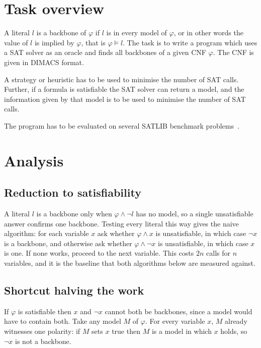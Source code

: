 \documentclass[11pt,a4paper]{article}
\begin{document}
\makereporttitle

\section{Task overview}

A literal $l$ is a backbone of $\varphi$ if $l$ is in every model of
$\varphi$, or in other words the value of $l$ is implied by $\varphi$, that is
$\varphi \models l$. The task is to write a program which uses a SAT solver as
an oracle and finds all backbones of a given CNF $\varphi$. The CNF is given
in DIMACS format.

A strategy or heuristic has to be used to minimise the number of SAT calls. Further, if a
formula is satisfiable the SAT solver can return a model, and the information
given by that model is to be used to minimise the number of SAT calls.

The program has to be evaluated on several SATLIB benchmark
problems~\cite{satlib}.

\section{Analysis}

\subsection*{Reduction to satisfiability}

A literal $l$ is a backbone only when $\varphi \wedge \neg l$ has no model,
so a single unsatisfiable answer confirms one backbone. Testing every literal
this way gives the naive algorithm: for each variable $x$ ask whether
$\varphi \wedge x$ is unsatisfiable, in which case $\neg x$ is a backbone, and
otherwise ask whether $\varphi \wedge \neg x$ is unsatisfiable, in which case
$x$ is one. If none works, proceed to the next variable. This costs $2n$ calls for $n$ variables, and it is the baseline
that both algorithms below are measured against.

\subsection*{Shortcut halving the work}

If $\varphi$ is satisfiable then $x$ and $\neg x$ cannot both be backbones,
since a model would have to contain both. Take any model $M$ of $\varphi$.
For every variable $x$, $M$ already witnesses one polarity: if $M$ sets $x$
true then $M$ is a model in which $x$ holds, so $\neg x$ is not a backbone.
\end{document}
